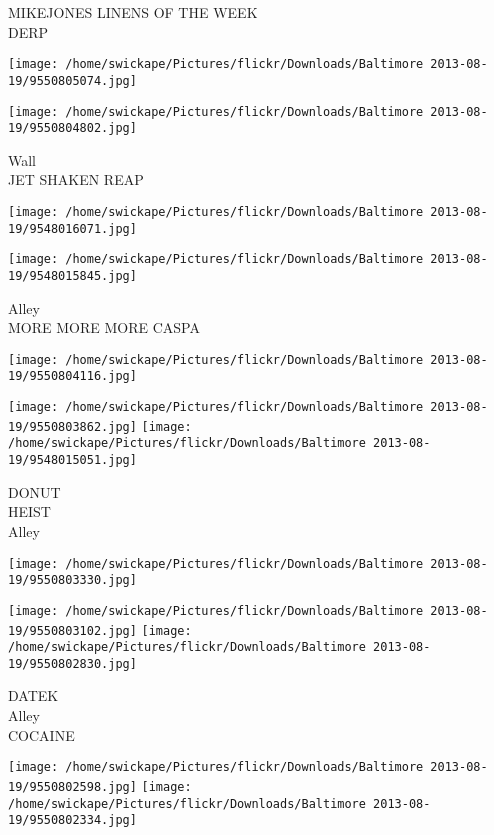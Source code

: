 \documentclass[10pt,letterpaper]{article}
\begin{document}
MIKEJONES LINENS OF THE WEEK\\
DERP\\
\pagebreak

\texttt{[image: /home/swickape/Pictures/flickr/Downloads/Baltimore 2013-08-19/9550805074.jpg]}

\vspace{0.25in}
\texttt{[image: /home/swickape/Pictures/flickr/Downloads/Baltimore 2013-08-19/9550804802.jpg]}

Wall\\
JET SHAKEN REAP\\
\pagebreak

\texttt{[image: /home/swickape/Pictures/flickr/Downloads/Baltimore 2013-08-19/9548016071.jpg]}

\vspace{0.25in}
\texttt{[image: /home/swickape/Pictures/flickr/Downloads/Baltimore 2013-08-19/9548015845.jpg]}

Alley\\
MORE MORE MORE CASPA\\
\pagebreak

\texttt{[image: /home/swickape/Pictures/flickr/Downloads/Baltimore 2013-08-19/9550804116.jpg]}

\vspace{0.25in}
\texttt{[image: /home/swickape/Pictures/flickr/Downloads/Baltimore 2013-08-19/9550803862.jpg]}
\texttt{[image: /home/swickape/Pictures/flickr/Downloads/Baltimore 2013-08-19/9548015051.jpg]}

DONUT\\
HEIST\\
Alley\\
\pagebreak

\texttt{[image: /home/swickape/Pictures/flickr/Downloads/Baltimore 2013-08-19/9550803330.jpg]}

\vspace{0.25in}
\texttt{[image: /home/swickape/Pictures/flickr/Downloads/Baltimore 2013-08-19/9550803102.jpg]}
\texttt{[image: /home/swickape/Pictures/flickr/Downloads/Baltimore 2013-08-19/9550802830.jpg]}

DATEK\\
Alley\\
COCAINE\\
\pagebreak

\texttt{[image: /home/swickape/Pictures/flickr/Downloads/Baltimore 2013-08-19/9550802598.jpg]}
\texttt{[image: /home/swickape/Pictures/flickr/Downloads/Baltimore 2013-08-19/9550802334.jpg]}
\end{document}
